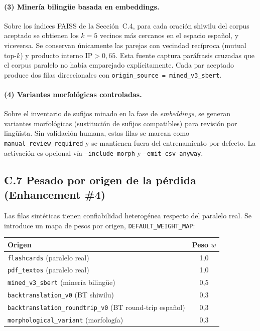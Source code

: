 \documentclass[12pt,a4paper,oneside]{book}
\begin{document}
\paragraph{(3) Minería bilingüe basada en embeddings.}
Sobre los índices FAISS de la Sección~C.4, para cada oración shiwilu del corpus aceptado se obtienen los \(k=5\) vecinos más cercanos en el espacio español, y viceversa. Se conservan únicamente las parejas con vecindad recíproca (mutual top-\(k\)) y producto interno \(\text{IP} > 0{,}65\). Esta fuente captura paráfrasis cruzadas que el corpus paralelo no había emparejado explícitamente. Cada par aceptado produce dos filas direccionales con \texttt{origin\_source = mined\_v3\_sbert}.

\paragraph{(4) Variantes morfológicas controladas.}
Sobre el inventario de sufijos minado en la fase de \emph{embeddings}, se generan variantes morfológicas (sustitución de sufijos compatibles) para revisión por lingüista. Sin validación humana, estas filas se marcan como \texttt{manual\_review\_required} y se mantienen fuera del entrenamiento por defecto. La activación es opcional vía \texttt{--include-morph} y \texttt{--emit-csv-anyway}.

\subsection*{C.7 Pesado por origen de la pérdida (Enhancement \#4)}\label{anexo-nmt-pesado}

Las filas sintéticas tienen confiabilidad heterogénea respecto del paralelo real. Se introduce un mapa de pesos por origen, \texttt{DEFAULT\_WEIGHT\_MAP}:

\begin{center}
\begin{tabular}{lc}
\toprule
\textbf{Origen} & \textbf{Peso \(w\)} \\
\midrule
\texttt{flashcards} (paralelo real) & 1{,}0 \\
\texttt{pdf\_textos} (paralelo real) & 1{,}0 \\
\texttt{mined\_v3\_sbert} (minería bilingüe) & 0{,}5 \\
\texttt{backtranslation\_v0} (BT shiwilu) & 0{,}3 \\
\texttt{backtranslation\_roundtrip\_v0} (BT round-trip español) & 0{,}3 \\
\texttt{morphological\_variant} (morfología) & 0{,}3 \\
\bottomrule
\end{tabular}
\end{center}
\end{document}
